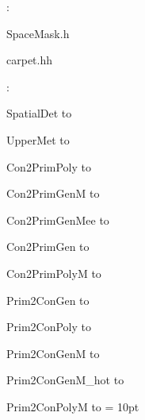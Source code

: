 \vspace{5mm}

: 

SpaceMask.h

carpet.hh
\vspace{2mm}

: 



SpatialDet to 

UpperMet to 

Con2PrimPoly to 

Con2PrimGenM to 

Con2PrimGenMee to 

Con2PrimGen to 

Con2PrimPolyM to 

Prim2ConGen to 

Prim2ConPoly to 

Prim2ConGenM to 

Prim2ConGenM\_hot to 

Prim2ConPolyM to 
\vspace{2mm}\parskip = 10pt 
